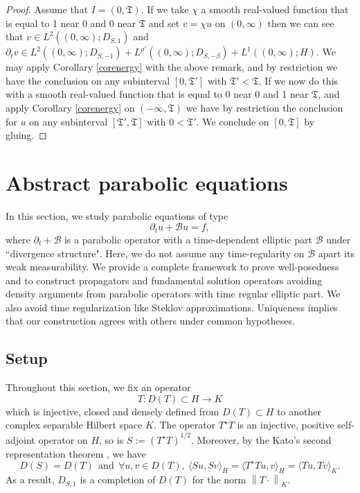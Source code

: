\documentclass[11pt, letterpaper]{amsart}
\theoremstyle{definition}
\theoremstyle{remark}
\numberwithin{equation}{section}
\begin{document}
{\begin{proof} Assume that $I=(0,\mathfrak{T})$. 
    If we take $\chi$ a smooth real-valued function that is equal to 1 near 0 and 0 near $\mathfrak{T}$ and set $v=\chi u$ on $(0,\infty)$ then we can see  that  
     $v  \in L^2((0,\infty); D_{{S},1})$ and  
     $\partial_tv \in L^2((0,\infty); D_{{S},-1})+ L^{\rho'}((0,\infty);D_{{S},-\beta})+ L^1((0,\infty);H).$ We may apply  Corollary \ref{corenergy} with the above remark, and by restriction we have the conclusion on any subinterval $[0,\mathfrak{T}']$ with $\mathfrak{T}'<\mathfrak{T}$. If we now do  this with  a smooth real-valued function that is equal to 0 near 0 and 1 near $\mathfrak{T}$, and apply Corollary \ref{corenergy} {on $(-\infty,\mathfrak{T})$} we have by restriction the conclusion for $u$ on any subinterval $[\mathfrak{T}',\mathfrak{T}]$ with
     $0<\mathfrak{T}'$. We conclude on $[0,\mathfrak{T}]$ by gluing.
    \end{proof}







\section{Abstract parabolic equations}\label{Section 5}
In this section, we study parabolic equations of type $$ \partial_t u + \mathcal{B}u=f, $$
where $\partial_t  + \mathcal{B}$ is a parabolic operator with a time-dependent elliptic part $\mathcal{B}$ under ``divergence structure". Here, we do not assume any time-regularity on $\mathcal{B}$ apart its weak measurability. We provide a complete framework to prove well-posedness and to construct propagators and fundamental solution operators avoiding density arguments from parabolic operators with  time regular elliptic part. We also avoid time regularization like Steklov approximations. Uniqueness implies that our construction agrees with others under common hypotheses.
\subsection{Setup}\label{sec:homogenoussetup}
Throughout this section, we fix an operator $$T: D(T)\subset H \rightarrow K$$ which is injective, closed and densely defined from $ D(T)\subset H $ to another complex separable Hilbert space $K$. The operator $T^\star T$ is an injective, positive self-adjoint operator on $H$, so is $S:=(T^\star T)^{1/2}$. Moreover, by the Kato's second representation theorem \cite{kato2013perturbation}, we have 
    \begin{equation*}
      D(S)=D(T) \  \ \mathrm{and} \ \  \forall u,v \in D(T), \  \langle Su, Sv \rangle_H = \langle T^\star Tu, v\rangle_H= \langle Tu, Tv\rangle_K.
    \end{equation*}
As a result, $D_{S,1}$ is a completion of $D(T)$ for the norm $\left\|T\cdot \right\|_K$.


}
\end{document}
